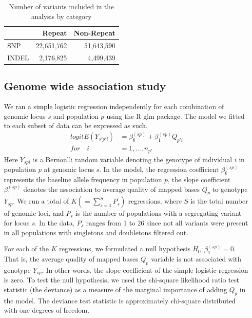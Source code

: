 \documentclass[9pt,lineno]{elife}
\begin{document}
\begin{table}[h]
\begin{tabular}{l  r r}
                      & {Repeat}  & {Non-Repeat}       \\ \hline
{SNP}  & 22,651,762 & 51,643,590  \\  
{INDEL} &  2,176,825  & 4,499,439 \\ \hline
\end{tabular}
\caption{Number of variants included in the analysis by category}
\label{totTable}
\end{table}

\subsection{Genome wide association study}
We ran a simple logistic regression independently for each combination of genomic locus $s$ and population $p$ using the R glm package\citep{RDevelopmentCoreTeam2016}. The model we fitted to each subset of data can be expressed as such.
\begin{align*}
{logit}{E(Y_{s'p'i})} &= \beta_{0}^{(sp)} + \beta_{1}^{(sp)} Q_{p'i}
\\
\textit{for}\quad i &= 1,\hdots, n_{p'}
\end{align*}
Here $Y_{spi}$ is a Bernoulli random variable denoting the genotype of individual $i$ in population $p$ at genomic locus $s$. 
In the model, the regression coefficient $\beta_{0}^{(sp)}$ represents the baseline allele frequency in population $p$, the slope coefficient $\beta_{1}^{(sp)}$ denotes the association to average quality of mapped bases $Q_{p}$ to genotype $Y_{sp}$. 
We run a total of $K (= \sum_{s=1}^S P_s)$ regressions, where $S$ is the total number of genomic loci, and $P_s$ is the number of populations with a segregating variant for locus $s$. 
In the data, $P_s$ ranges from 1 to 26 since not all variants were present in all populations with singletons and doubletons filtered out.

For each of the $K$ regressions, we formulated a null hypothesis $H_{0}: \beta_{1}^{(sp)}=0$. That is, the average quality of mapped bases $Q_{p}$ variable is not associated with genotype $Y_{sp}$.
In other words, the slope coefficient of the simple logistic regression is zero.
To test the null hypothesis, we used the chi-square likelihood ratio test statistic (the deviance) as a measure of the marginal importance of adding $Q_{p}$ in the model. 
The deviance test statistic is approximately chi-square distributed with one degrees of freedom.  
\end{document}
